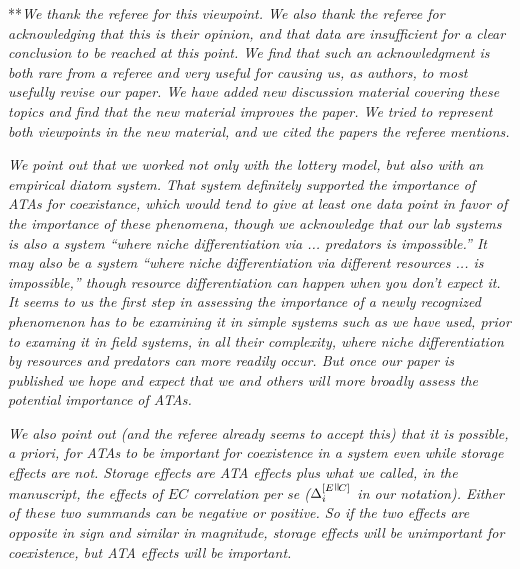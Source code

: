 \documentclass[letterpaper,11pt]{article}
\newcommand{\nat}{%
\text{\hspace{-1.5pt}
\begin{tikzpicture}[scale=1.8]%
\draw (.333ex,0) -- (.333ex,1ex);%
\draw (.666ex,0) -- (.666ex,1ex);
\end{tikzpicture}%
}}
\begin{document}
\noindent ***\emph{We thank the referee for this viewpoint. We also thank the referee for acknowledging that this
is their opinion, and that data are insufficient for a clear conclusion to be reached at this point. We find that 
such an acknowledgment is both rare from a referee and very useful for causing us, as authors, to most usefully revise our 
paper. We have added new discussion material covering these topics and find that the new material improves the paper.
We tried to represent both viewpoints in the new material, and we cited the papers the referee mentions.}

\emph{We point out that we worked not only
with the lottery model, but also with an empirical diatom system. That system definitely supported the importance of 
ATAs for coexistance, which would tend to give at least one data point in favor of the importance of these phenomena, though we 
acknowledge that our lab systems is also a system ``where niche differentiation via ... predators is impossible.''
It may also be a system ``where niche differentiation via different resources ... is impossible,'' though resource 
differentiation can happen when you don't expect it. It seems to us 
the first step in assessing the importance of a newly recognized phenomenon has to be examining it in simple systems
such as we have used, prior to examing it in field systems, in all their complexity, where niche differentiation
by resources and predators can more readily occur. But once our paper is published we hope and expect that we and
others will more broadly assess the potential importance of ATAs.}

\emph{We also point
out (and the referee already seems to accept this) that it is possible, \emph{a priori}, for ATAs to be 
important for coexistence in a system even while storage effects are not.
Storage effects are ATA effects plus what we called, in the manuscript, the effects of $EC$ correlation \emph{per se} 
($\Delta_i^{[E \nat C]}$ in our notation). Either of these two summands can be negative or positive.
So if the two effects are opposite in sign and similar in magnitude, storage effects will be unimportant for 
coexistence, but ATA effects will be important.}
\end{document}
